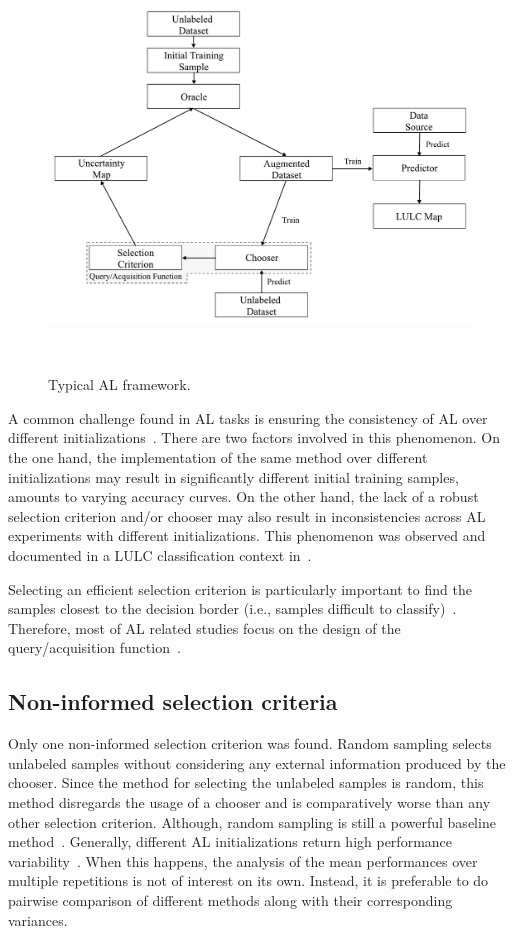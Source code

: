 \documentclass[parskip=full]{scrartcl}
\begin{document}
\begin{figure}[htb]
	\centering
	\includegraphics[width=.85\linewidth]{../analysis/al_typical}
	\caption{Typical AL framework.
    }~\label{fig:al_typical}
\end{figure}

A common challenge found in AL tasks is ensuring the consistency of AL over
different initializations~\cite{Kottke2017}. There are two factors involved in
this phenomenon. On the one hand, the implementation of the same method over
different initializations may result in significantly different initial
training samples, amounts to varying accuracy curves. On the other hand, the
lack of a robust selection criterion and/or chooser may also result in
inconsistencies across AL experiments with different initializations. This
phenomenon was observed and documented in a LULC classification context
in~\cite{tuia2011using}.

Selecting an efficient selection criterion is particularly important to find
the samples closest to the decision border (i.e., samples difficult to
classify)~\cite{Shrivastava2021}. Therefore, most of AL related studies focus
on the design of the query/acquisition function~\cite{Su2020}.

\subsection{Non-informed selection criteria}

Only one non-informed selection criterion was found. Random sampling selects
unlabeled samples without considering any external information produced by the
chooser. Since the method for selecting the unlabeled samples is random, this
method disregards the usage of a chooser and is comparatively worse than any
other selection criterion. Although, random sampling is still a powerful
baseline method~\cite{Cawley2011}. Generally, different AL initializations
return high performance variability~\cite{Kottke2017}. When this happens, the
analysis of the mean performances over multiple repetitions is not of interest
on its own. Instead, it is preferable to do pairwise comparison of different
methods along with their corresponding variances. 
\end{document}
